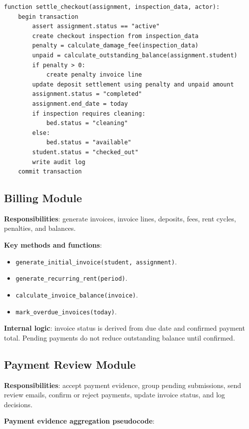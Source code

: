 \documentclass[11pt,a4paper]{article}
\begin{document}
\begin{verbatim}
function settle_checkout(assignment, inspection_data, actor):
    begin transaction
        assert assignment.status == "active"
        create checkout inspection from inspection_data
        penalty = calculate_damage_fee(inspection_data)
        unpaid = calculate_outstanding_balance(assignment.student)
        if penalty > 0:
            create penalty invoice line
        update deposit settlement using penalty and unpaid amount
        assignment.status = "completed"
        assignment.end_date = today
        if inspection requires cleaning:
            bed.status = "cleaning"
        else:
            bed.status = "available"
        student.status = "checked_out"
        write audit log
    commit transaction
\end{verbatim}

\subsection{Billing Module}
\textbf{Responsibilities}: generate invoices, invoice lines, deposits, fees, rent cycles, penalties, and balances.

\textbf{Key methods and functions}:
\begin{itemize}
  \item \texttt{generate\_initial\_invoice(student, assignment)}.
  \item \texttt{generate\_recurring\_rent(period)}.
  \item \texttt{calculate\_invoice\_balance(invoice)}.
  \item \texttt{mark\_overdue\_invoices(today)}.
\end{itemize}

\textbf{Internal logic}: invoice status is derived from due date and confirmed payment total. Pending payments do not reduce outstanding balance until confirmed.

\subsection{Payment Review Module}
\textbf{Responsibilities}: accept payment evidence, group pending submissions, send review emails, confirm or reject payments, update invoice status, and log decisions.

\textbf{Payment evidence aggregation pseudocode}:
\end{document}
